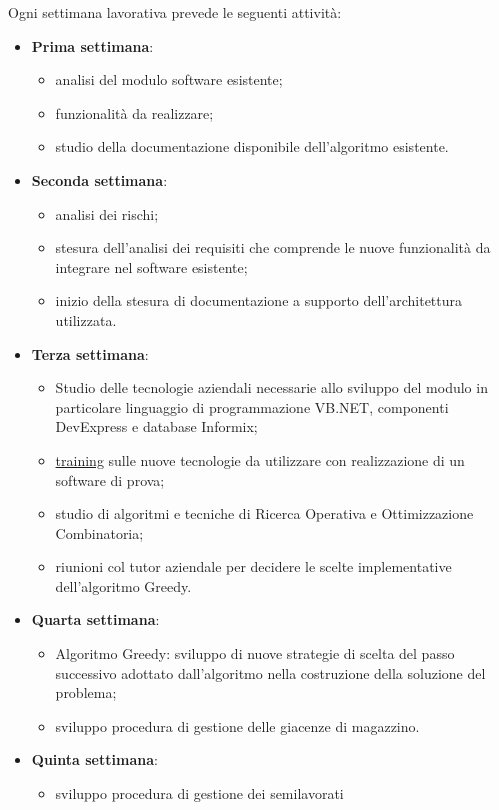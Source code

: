 Ogni settimana lavorativa prevede le seguenti attività:
\begin{itemize}
	\item \textbf{Prima settimana}:
	\begin{itemize}
		 \item analisi del modulo software esistente;
		 \item funzionalità da realizzare;
	 	 \item studio della documentazione disponibile dell’algoritmo esistente.
	\end{itemize}
	\item \textbf{Seconda settimana}: 
	\begin{itemize}
		\item analisi dei rischi;
		\item stesura dell'analisi dei requisiti che comprende le nuove funzionalità da integrare nel software esistente;
		\item  inizio della stesura di documentazione a supporto dell'architettura utilizzata.
	\end{itemize}
	\newpage
	\item \textbf{Terza settimana}:
		\begin{itemize}
		\item Studio delle tecnologie aziendali necessarie allo sviluppo del
		modulo in particolare linguaggio di programmazione VB.NET, componenti
		DevExpress e database Informix;
		\item  \hyperref[Training]{training\glo} sulle nuove tecnologie da utilizzare con realizzazione di un software di prova;
		\item studio di algoritmi e tecniche di Ricerca Operativa e	Ottimizzazione Combinatoria;
		\item riunioni col tutor aziendale per decidere le scelte implementative dell'algoritmo Greedy.
	\end{itemize}
	\item \textbf{Quarta settimana}:
		\begin{itemize}
		\item Algoritmo Greedy: sviluppo di nuove strategie di scelta
		del passo successivo adottato dall’algoritmo nella
		costruzione della soluzione del problema;
		\item sviluppo procedura di gestione delle giacenze di
		magazzino.
		\end{itemize}
	\item \textbf{Quinta settimana}:
		\begin{itemize}
		\item sviluppo procedura di gestione dei semilavorati

\end{itemize}
\end{itemize}
